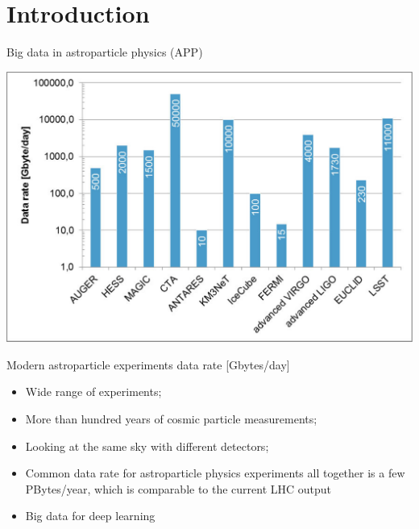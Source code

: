 
\begin{frame}
\titlepage
\end{frame}

\section{Introduction}

\begin{frame}{Big data in astroparticle physics (APP)}
    \small
    \begin{minipage}[c]{0.58\textwidth}
        \begin{center}
            \includegraphics[width=1\textwidth]{pics/appec_computing-diagram.pdf}
        \end{center}
        \vspace{-2\parsep}
        \small Modern astroparticle experiments data rate [Gbytes/day]\footnotemark[1] %
    \end{minipage}
    \hfill
    \begin{minipage}[c]{0.41\textwidth}
        \begin{itemize}
            \setlength{\itemsep}{0pt}
            \item Wide range of experiments;
            \item More than hundred years of cosmic particle measurements;
            \item Looking at the same sky with different detectors;
            \item Common data rate for astroparticle physics experiments all together is a few PBytes/year, which is comparable to the current LHC output\footnotemark[1]
            \item Big data for deep learning
        \end{itemize}
    \end{minipage}
    \footnotesize{}
\end{frame}

